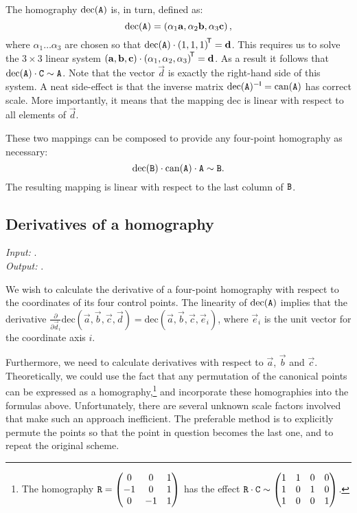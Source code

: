 The homography $\mathrm{dec}(\mathtt{A})$ is, in turn, defined as:
$$\mathrm{dec}(\mathtt{A}) = \left( \alpha_1 \mathbf{a}, \alpha_2 \mathbf{b}, \alpha_3 \mathbf{c} \right),$$
where $\alpha_1 \dots \alpha_3$ are chosen so that $\mathrm{dec}(\mathtt{A}) \cdot \left( 1, 1, 1 \right)^{\!\mathsf{T}} = \mathbf{d}$.
This requires us to solve the $3 \times 3$ linear system $\left(\mathbf{a}, \mathbf{b}, \mathbf{c} \right) \cdot \left(\alpha_1, \alpha_2, \alpha_3 \right) ^{\!\mathsf{T}} = \mathbf{d}$.
As a result it follows that $\mathrm{dec}(\mathtt{A}) \cdot \mathtt{C} \sim \mathtt{A}$.
Note that the vector $\vec d$ is exactly the right-hand side of this system.
A neat side-effect is that the inverse matrix $\mathrm{dec}(\mathtt{A}) ^{-\mathsf{I}} = \mathrm{can}(\mathtt{A})$ has correct scale. 
More importantly, it means that the mapping $\mathrm{dec}$ is linear with respect to all elements of $\vec d$.

These two mappings can be composed to provide any four-point homography as necessary:
$$\mathrm{dec}(\mathtt{B}) \cdot \mathrm{can}(\mathtt{A}) \cdot \mathtt{A} \sim \mathtt{B}.$$
The resulting mapping is linear with respect to the last column of $\mathtt{B}$.


\subsection{Derivatives of a homography}
\label{s.homderivatives}

\textit{Input:} .\\
\textit{Output:} .\\


We wish to calculate the derivative of a four-point homography with respect to the coordinates of its four control points.
The linearity of $\mathrm{dec}(\mathtt{A})$ implies that the derivative $\frac{\partial} {\partial \vec d_i} \mathrm{dec} \left( \vec a, \vec b, \vec c, \vec d \right) = \mathrm{dec} \left( \vec a, \vec b, \vec c, \vec e_i \right)$, where $\vec e_i$ is the unit vector for the coordinate axis $i$.

Furthermore, we need to calculate derivatives with respect to $\vec a$, $\vec b$ and $\vec c$.
Theoretically, we could use the fact that any permutation of the canonical points can be expressed as a homography,\footnote{
The homography $\mathtt{R} = \begin{pmatrix}
 0 & 0 & 1 \\
 -1 & 0 & 1 \\
 0 & -1 & 1
 \end{pmatrix}$ has the effect $\mathtt{R} \cdot \mathtt{C} \sim \begin{pmatrix}
 1 & 1 & 0 & 0 \\
 1 & 0 & 1 & 0 \\
 1 & 0 & 0 & 1
 \end{pmatrix}$.
} and incorporate these homographies into the formulas above.
Unfortunately, there are several unknown scale factors involved that make such an approach inefficient.
The preferable method is to explicitly permute the points so that the point in question becomes the last one, and to repeat the original scheme.

